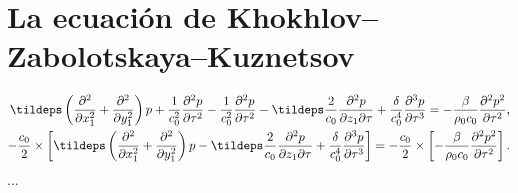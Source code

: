 \chapter{La ecuación de Khokhlov–Zabolotskaya–Kuznetsov}\label{chapter.kzk}

\begin{align}
\tildeps\left( \frac{\partial^2}{\partial x_1^2} +\frac{\partial^2}{\partial y_1^2}\right)p +\frac{1}{c_0^2}\frac{\partial^2p}{\partial \tau^2} - \frac{1}{c_0^2}\frac{\partial^2p}{\partial \tau^2} - \tildeps \frac{2}{c_0}\frac{\partial^2p}{\partial z_1\partial \tau}+ \frac{\delta}{c_0^4}\frac{\partial^3p}{\partial \tau^3} = -\frac{\beta}{\rho_0 c_0}\frac{\partial^2p^2}{\partial \tau^2}\text{,}\nonumber \\
-\frac{c_0}{2}\times\left[\tildeps\left( \frac{\partial^2}{\partial x_1^2} +\frac{\partial^2}{\partial y_1^2}\right)p - \tildeps \frac{2}{c_0} \frac{\partial^2p}{\partial z_1\partial \tau}+
\frac{\delta}{c_0^4}\frac{\partial^3p}{\partial \tau^3}\right]  = -\frac{c_0}{2}\times\left[-\frac{\beta}{\rho_0 c_0}\frac{\partial^2p^2}{\partial \tau^2}\right] \label{eqn:prekzk}\text{.}
\end{align}
%
...
